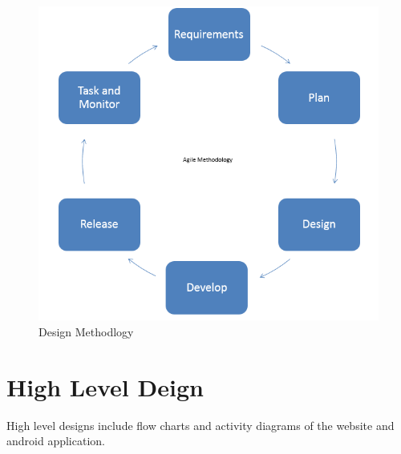\begin{figure}[H]
  \centering
    \includegraphics[scale=0.6]{Designmethod}
     \caption{Design Methodlogy}
\end{figure}



\newpage
\section{High Level Deign}
High level designs include flow charts and activity diagrams of the website and android application.

